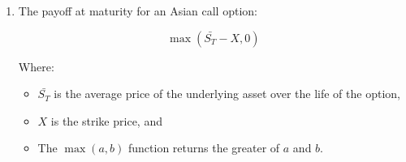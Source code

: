 \documentclass{article}
\begin{document}
\begin{enumerate}
\item The payoff at maturity for an Asian call option:

\begin{equation*}
\max(\bar{S_T} - X, 0)
\end{equation*}

Where:
\begin{itemize}
\item \(\bar{S_T}\) is the average price of the underlying asset over the life of the option,
\item \(X\) is the strike price, and
\item The \(\max(a, b)\) function returns the greater of \(a\) and \(b\).
\end{itemize}
\end{enumerate}
\end{document}
